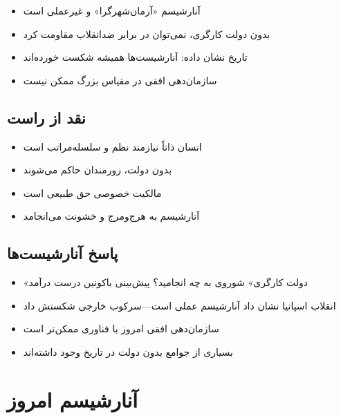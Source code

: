 \begin{itemize}[nosep, rightmargin=1.5cm]
    \item آنارشیسم «آرمان‌شهرگرا» و غیرعملی است
    \item بدون دولت کارگری، نمی‌توان در برابر ضدانقلاب مقاومت کرد
    \item تاریخ نشان داده: آنارشیست‌ها همیشه شکست خورده‌اند
    \item سازمان‌دهی افقی در مقیاس بزرگ ممکن نیست
\end{itemize}

\subsection{نقد از راست}

\begin{itemize}[nosep, rightmargin=1.5cm]
    \item انسان ذاتاً نیازمند نظم و سلسله‌مراتب است
    \item بدون دولت، زورمندان حاکم می‌شوند
    \item مالکیت خصوصی حق طبیعی است
    \item آنارشیسم به هرج‌ومرج و خشونت می‌انجامد
\end{itemize}

\subsection{پاسخ آنارشیست‌ها}

\begin{itemize}[nosep, rightmargin=1.5cm]
    \item «دولت کارگری» شوروی به چه انجامید؟ پیش‌بینی باکونین درست درآمد
    \item انقلاب اسپانیا نشان داد آنارشیسم عملی است—سرکوب خارجی شکستش داد
    \item سازمان‌دهی افقی امروز با فناوری ممکن‌تر است
    \item بسیاری از جوامع بدون دولت در تاریخ وجود داشته‌اند
\end{itemize}

\section{آنارشیسم امروز}

